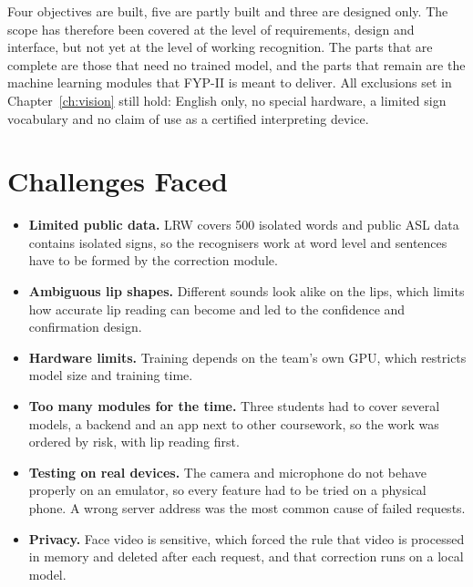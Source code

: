 \documentclass{FastFyp}
\begin{document}
Four objectives are built, five are partly built and three are designed only. The scope has therefore been covered at the level of requirements, design and interface, but not yet at the level of working recognition. The parts that are complete are those that need no trained model, and the parts that remain are the machine learning modules that FYP-II is meant to deliver. All exclusions set in Chapter~\ref{ch:vision} still hold: English only, no special hardware, a limited sign vocabulary and no claim of use as a certified interpreting device.

\section{Challenges Faced}
\begin{itemize}
  \item \textbf{Limited public data.} LRW covers 500 isolated words and public ASL data contains isolated signs, so the recognisers work at word level and sentences have to be formed by the correction module.
  \item \textbf{Ambiguous lip shapes.} Different sounds look alike on the lips, which limits how accurate lip reading can become and led to the confidence and confirmation design.
  \item \textbf{Hardware limits.} Training depends on the team's own GPU, which restricts model size and training time.
  \item \textbf{Too many modules for the time.} Three students had to cover several models, a backend and an app next to other coursework, so the work was ordered by risk, with lip reading first.
  \item \textbf{Testing on real devices.} The camera and microphone do not behave properly on an emulator, so every feature had to be tried on a physical phone. A wrong server address was the most common cause of failed requests.
  \item \textbf{Privacy.} Face video is sensitive, which forced the rule that video is processed in memory and deleted after each request, and that correction runs on a local model.
\end{itemize}
\end{document}
